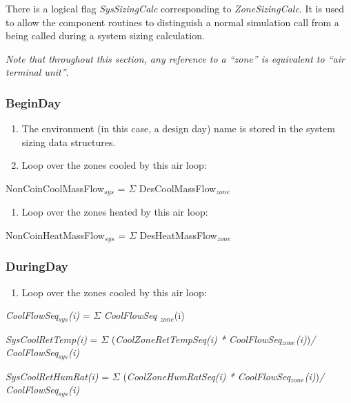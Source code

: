 There is a logical flag \emph{SysSizingCalc} corresponding to \emph{ZoneSizingCalc}. It is used to allow the component routines to distinguish a normal simulation call from a being called during a system sizing calculation.

\emph{Note that throughout this section, any reference to a ``zone'' is equivalent to ``air terminal unit''}.

\subsubsection{BeginDay}\label{beginday}

\begin{enumerate}
\def\labelenumi{(\arabic{enumi})}
\item
  The environment (in this case, a design day) name is stored in the system sizing data structures.
\item
  Loop over the zones cooled by this air loop: 
\end{enumerate}

{\setlength\parindent{25pt} NonCoinCoolMassFlow\(_{sys}\) = $\Sigma$ {DesCoolMassFlow\(_{zone}\)} }

\begin{enumerate}
\def\labelenumi{(\arabic{enumi})}
\setcounter{enumi}{2}
\tightlist
\item
  Loop over the zones heated by this air loop: 
\end{enumerate}

{\setlength\parindent{25pt} NonCoinHeatMassFlow\(_{sys}\) = $\Sigma$ {DesHeatMassFlow\(_{zone}\)} }

\subsubsection{DuringDay}\label{duringday}

\begin{enumerate}
\def\labelenumi{(\arabic{enumi})}
\tightlist
\item
  Loop over the zones cooled by this air loop:
\end{enumerate}

\emph{CoolFlowSeq\(_{sys}\)(i)} = $\Sigma$ \emph{CoolFlowSeq \(_{zone}\)}(i)

\emph{SysCoolRetTemp(i)} = $\Sigma$ (\emph{CoolZoneRetTempSeq(i) * CoolFlowSeq\(_{zone}\)(i)})\emph{/ CoolFlowSeq\(_{sys}\)(i)}

\emph{SysCoolRetHumRat(i)} = $\Sigma$ (\emph{CoolZoneHumRatSeq(i) * CoolFlowSeq\(_{zone}\)(i)})\emph{/ CoolFlowSeq\(_{sys}\)(i)}

